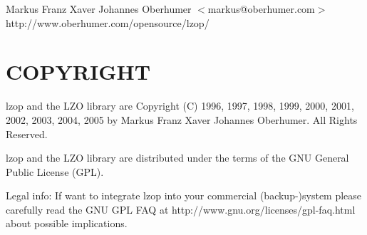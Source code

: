 Markus Franz Xaver Johannes Oberhumer
$<$markus@oberhumer.com$>$
http://www.oberhumer.com/opensource/lzop/

\section{COPYRIGHT\label{COPYRIGHT}}


lzop and the LZO library are
Copyright (C) 1996, 1997, 1998, 1999, 2000, 2001, 2002, 2003, 2004, 2005
by Markus Franz Xaver Johannes Oberhumer.
All Rights Reserved.



lzop and the LZO library are distributed under the terms
of the GNU General Public License (GPL).



Legal info: If want to integrate lzop into your commercial (backup-)system
please carefully read the GNU GPL FAQ at http://www.gnu.org/licenses/gpl-faq.html
about possible implications.


